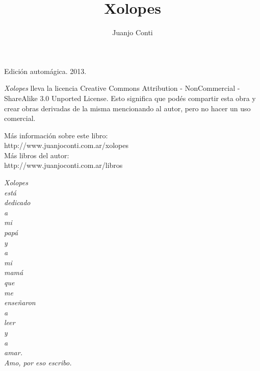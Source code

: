 \documentclass[12pt,twoside,openright,a5paper]{book}
\title{Xolopes}
\author{Juanjo Conti}
\date{}
\begin{document}
\pagestyle{plain}

\maketitle

\cleardoublepage

\thispagestyle{empty}
\noindent
Edición automágica. 2013.\\

\vspace{0.5cm}

\noindent
\emph{Xolopes} lleva la licencia 
Creative Commons Attribution - NonCommercial - ShareAlike 3.0 Unported License.
Esto significa que podés compartir esta obra y crear obras derivadas de la misma
mencionando al autor, pero no ha\-cer un uso comercial.

\vfill

\noindent
Más información sobre este libro:\\
http://www.juanjoconti.com.ar/xolopes\\

\noindent
Más libros del autor:\\
http://www.juanjoconti.com.ar/libros

\cleardoublepage

\noindent
\begin{flushright}
\emph{
\emph{Xolopes} \\está \\dedicado \\a \\mi \\papá \\y \\a \\mi \\mamá\\
que \\me \\enseñaron \\a \\leer \\y \\a \\amar.\\
\vspace{0.5cm}
Amo, por eso escribo.
}

\end{flushright}


\cleardoublepage
\end{document}
